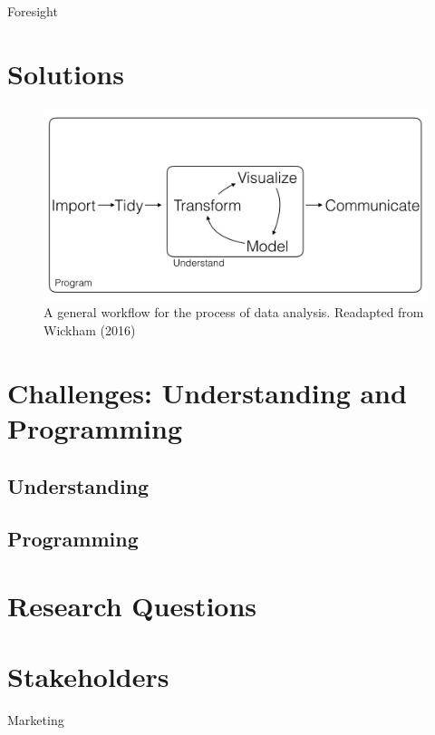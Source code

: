 \documentclass[]{book}
\begin{document}
Foresight

\section{Solutions}\label{solutions}

\begin{figure}

{\centering \includegraphics[width=0.8\linewidth]{_bookdown_files/figures/main_work_flow} 

}

\caption{A general workflow for the process of data analysis. Readapted from Wickham (2016)}\label{fig:mainworkflow}
\end{figure}

\section{Challenges: Understanding and
Programming}\label{challenges-understanding-and-programming}

\subsection{Understanding}\label{understanding}

\subsection{Programming}\label{programming}

\section{Research Questions}\label{research-questions}

\section{Stakeholders}\label{stakeholders}

Marketing
\end{document}
